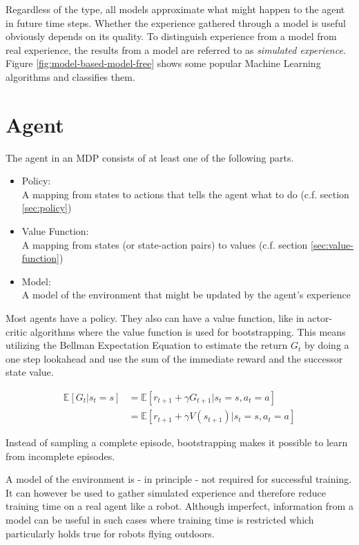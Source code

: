 Regardless of the type, all models approximate what might happen to the agent in future time steps. Whether the experience gathered through a model is useful obviously depends on its quality. To distinguish experience from a model from real experience, the results from a model are referred to as \textit{simulated experience}\cite{SuttonBarto2018}. Figure \ref{fig:model-based-model-free} shows some popular Machine Learning algorithms and classifies them.

\section{Agent}

The agent in an MDP consists of at least one of the following parts.

\begin{itemize}
	\item Policy: \\
	A mapping from states to actions that tells the agent what to do (c.f. section \ref{sec:policy})
	\item Value Function: \\
	A mapping from states (or state-action pairs) to values (c.f. section \ref{sec:value-function})
	\item Model: \\
	A model of the environment that might be updated by the agent's experience
\end{itemize}

Most agents have a policy. They also can have a value function, like in actor-critic algorithms where the value function is used for bootstrapping. This means utilizing the Bellman Expectation Equation to estimate the return $G_t$ by doing a one step lookahead and use the sum of the immediate reward and the successor state value.

\begin{align}
\mathbb{E}[G_t|s_t=s] &= \mathbb{E}[r_{t+1} + \gamma G_{t+1}|s_t=s, a_t=a] \\
&=\mathbb{E}[r_{t+1}+ \gamma V(s_{t+1})|s_t=s, a_t=a]
\end{align}

Instead of sampling a complete episode, bootstrapping makes it possible to learn from incomplete episodes.

A model of the environment is - in principle - not required for successful training. It can however be used to gather simulated experience and therefore reduce training time on a real agent like a robot. Although imperfect, information from a model can be useful in such cases where training time is restricted which particularly holds true for robots flying outdoors.

